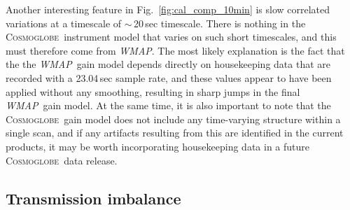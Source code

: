 \documentclass[twocolumn]{../../common/aa}
\def\WMAP{\emph{WMAP}}
\newcommand{\cosmoglobe}{\textsc{Cosmoglobe}}
\begin{document}
Another interesting feature in Fig.~\ref{fig:cal_comp_10min} is slow correlated variations at a timescale of $\sim$\,20\,sec timescale. There is nothing in the \cosmoglobe\ instrument model that varies on such short timescales, and this must therefore come from \WMAP. The most likely explanation is the fact that the the \WMAP\ gain model depends directly on housekeeping data that are recorded with a 23.04\,sec sample rate, and these values appear to have been applied without any smoothing, resulting in sharp jumps in the final \WMAP\ gain model. At the same time, it is also important to note that the \cosmoglobe\ gain model does not include any time-varying structure within a single scan, and if any artifacts resulting from this are identified in the current products, it may be worth incorporating housekeeping data in a future  \cosmoglobe\ data release.




\subsection{Transmission imbalance}
\label{sec:xim}
\end{document}
